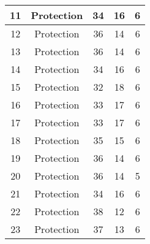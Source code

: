 \documentclass[results.tex]{subfiles}
\begin{document}
\begin{center}
\begin{tabular}{| c || c | c | c | c |}
            \hline
            11                      & Protection                   & 34                     & 16                      & 6                    \\
            \hline
            12                      & Protection                   & 36                     & 14                      & 6                    \\
            \hline
            13                      & Protection                   & 36                     & 14                      & 6                    \\
            \hline
            14                      & Protection                   & 34                     & 16                      & 6                    \\
            \hline
            15                      & Protection                   & 32                     & 18                      & 6                    \\
            \hline
            16                      & Protection                   & 33                     & 17                      & 6                    \\
            \hline
            17                      & Protection                   & 33                     & 17                      & 6                    \\
            \hline
            18                      & Protection                   & 35                     & 15                      & 6                    \\
            \hline
            19                      & Protection                   & 36                     & 14                      & 6                    \\
            \hline
            20                      & Protection                   & 36                     & 14                      & 5                    \\
            \hline
            21                      & Protection                   & 34                     & 16                      & 6                    \\
            \hline
            22                      & Protection                   & 38                     & 12                      & 6                    \\
            \hline
            23                      & Protection                   & 37                     & 13                      & 6                    \\

\end{tabular}
\end{center}
\end{document}
